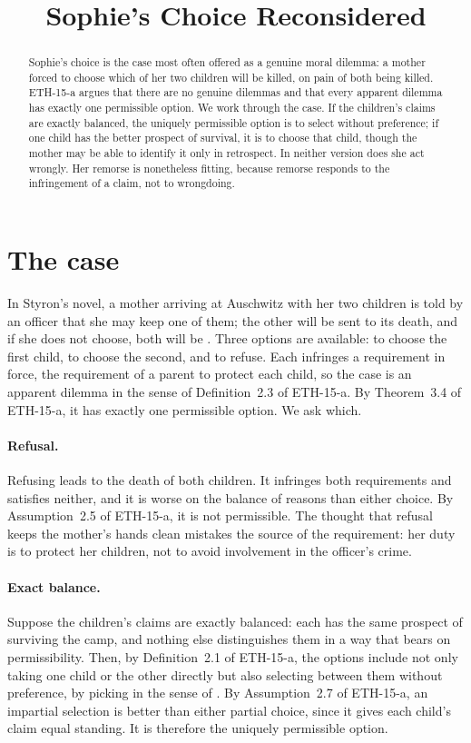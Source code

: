 \documentclass{situationist-preprint}
\title{Sophie's Choice Reconsidered}
\begin{document}
\maketitle

\begin{abstract}
Sophie's choice is the case most often offered as a genuine moral dilemma: a mother forced to choose which of her two children will be killed, on pain of both being killed. ETH-15-a argues that there are no genuine dilemmas and that every apparent dilemma has exactly one permissible option. We work through the case. If the children's claims are exactly balanced, the uniquely permissible option is to select without preference; if one child has the better prospect of survival, it is to choose that child, though the mother may be able to identify it only in retrospect. In neither version does she act wrongly. Her remorse is nonetheless fitting, because remorse responds to the infringement of a claim, not to wrongdoing.
\end{abstract}

\section{The case}

In Styron's novel, a mother arriving at Auschwitz with her two children is told by an officer that she may keep one of them; the other will be sent to its death, and if she does not choose, both will be \citep{Styron1979}. Three options are available: to choose the first child, to choose the second, and to refuse. Each infringes a requirement in force, the requirement of a parent to protect each child, so the case is an apparent dilemma in the sense of Definition~2.3 of ETH-15-a. By Theorem~3.4 of ETH-15-a, it has exactly one permissible option. We ask which.

\paragraph{Refusal.} Refusing leads to the death of both children. It infringes both requirements and satisfies neither, and it is worse on the balance of reasons than either choice. By Assumption~2.5 of ETH-15-a, it is not permissible. The thought that refusal keeps the mother's hands clean mistakes the source of the requirement: her duty is to protect her children, not to avoid involvement in the officer's crime.

\paragraph{Exact balance.} Suppose the children's claims are exactly balanced: each has the same prospect of surviving the camp, and nothing else distinguishes them in a way that bears on permissibility. Then, by Definition~2.1 of ETH-15-a, the options include not only taking one child or the other directly but also selecting between them without preference, by picking in the sense of \citet{UllmannMargalitMorgenbesser1977}. By Assumption~2.7 of ETH-15-a, an impartial selection is better than either partial choice, since it gives each child's claim equal standing. It is therefore the uniquely permissible option.
\end{document}
